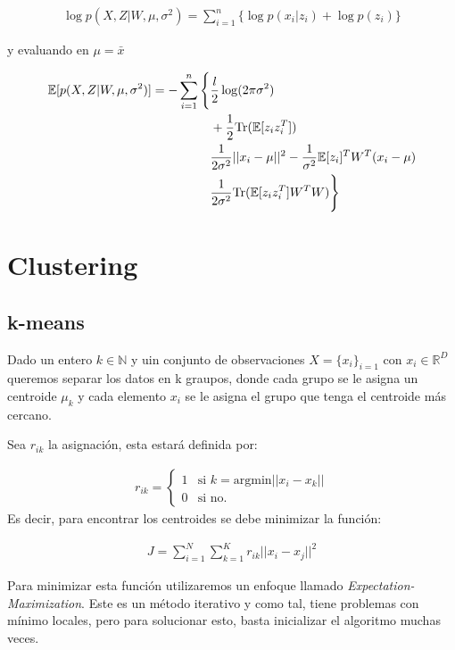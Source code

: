 \begin{align}
    \log p(X, Z|W, \mu, \sigma^2) = \sum_{i=1}^n \{\log p(x_i|z_i) + \log p(z_i)\}
\end{align}

y evaluando en $\mu = \bar{x}$

\begin{align}
\notag \mathbb{E}[ p(X,Z |W, \mu, \sigma^2) ] =  -\sum_{i=1}^n \Bigg\{ &\frac{l}{2} \log (2\pi \sigma^2)\\
\notag & + \frac{1}{2}\text{Tr}(\mathbb{E}[z_iz_i^T])\\
\notag & \frac{1}{2\sigma^2}||x_i - \mu||^2 - \frac{1}{\sigma^2}\mathbb{E}[z_i]^T W^T (x_i - \mu)\\
& \frac{1}{2\sigma^2} \text{Tr}(\mathbb{E}[z_iz_i^T]W^T W) \Bigg\}
\end{align}

\section{Clustering}

\subsection{k-means}
Dado un entero $k \in \mathbb{N}$ y uin conjunto de observaciones $X = \{x_i\}_{i=1}$ con $x_i\in \mathbb{R}^D$ queremos separar los datos en k graupos, donde cada grupo se le asigna un centroide $\mu_k$ y cada elemento $x_i$ se le asigna el grupo que tenga el centroide más cercano.

Sea $r_{ik}$ la asignación, esta estará definida por:

\begin{align*}
r_{ik} = \begin{cases}
1 & \text{si } k = \text{argmin}||x_i-x_k||\\
0 & \text{si no.}
\end{cases}
\end{align*}
Es decir, para encontrar los centroides se debe minimizar la función:

\begin{align}
J = \sum_{i=1}^N \sum_{k=1}^K r_{ik} ||x_i-x_j||^2
\end{align}

Para minimizar esta función utilizaremos un enfoque llamado \emph{Expectation-Maximization}. Este es un método iterativo y como tal, tiene problemas con mínimo locales, pero para solucionar esto, basta inicializar el algoritmo muchas veces.

